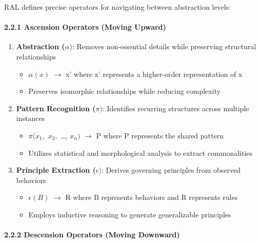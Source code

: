 \documentclass[
]{article}
\providecommand{\tightlist}{%
  \setlength{\itemsep}{0pt}\setlength{\parskip}{0pt}}
\begin{document}
RAL defines precise operators for navigating between abstraction levels:

\paragraph{2.2.1 Ascension Operators (Moving
Upward)}\label{ascension-operators-moving-upward}

\begin{enumerate}
\def\labelenumi{\arabic{enumi}.}
\tightlist
\item
  \textbf{Abstraction (\(\alpha )\)}: Removes non-essential details
  while preserving structural relationships

  \begin{itemize}
  \tightlist
  \item
    \(\alpha (x)\) \(\to \) x' where x' represents a higher-order
    representation of x
  \item
    Preserves isomorphic relationships while reducing complexity
  \end{itemize}
\item
  \textbf{Pattern Recognition (\(\pi )\)}: Identifies recurring
  structures across multiple instances

  \begin{itemize}
  \tightlist
  \item
    \(\pi (x_{1},\) \(x_{2},\) \ldots, \(x_{n})\) \(\to \) P where P
    represents the shared pattern
  \item
    Utilizes statistical and morphological analysis to extract
    commonalities
  \end{itemize}
\item
  \textbf{Principle Extraction (\(\epsilon )\)}: Derives governing
  principles from observed behaviors

  \begin{itemize}
  \tightlist
  \item
    \(\epsilon (B)\) \(\to \) R where B represents behaviors and R
    represents rules
  \item
    Employs inductive reasoning to generate generalizable principles
  \end{itemize}
\end{enumerate}

\paragraph{2.2.2 Descension Operators (Moving
Downward)}\label{descension-operators-moving-downward}
\end{document}

